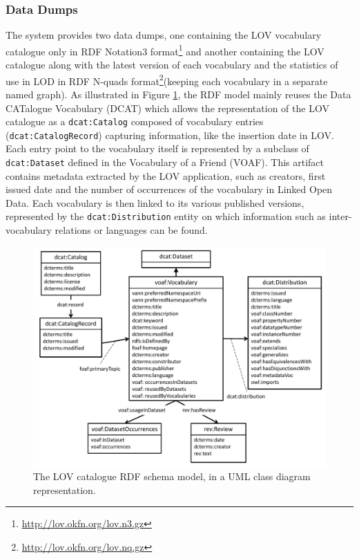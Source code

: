 \documentclass{iosart2c}
\begin{document}
\subsubsection{Data Dumps}
The system provides two data dumps, one containing the LOV vocabulary catalogue only in RDF Notation3 format\footnote{\url{http://lov.okfn.org/lov.n3.gz}} and another containing the LOV catalogue along with the latest version of each vocabulary and the statistics of use in LOD in RDF N-quads format\footnote{\url{http://lov.okfn.org/lov.nq.gz}}(keeping each vocabulary in a separate named graph). As illustrated in Figure \ref{fig:model}, the RDF model mainly reuses the Data CATalogue Vocabulary (DCAT) which allows the representation of the LOV catalogue as a {\small\texttt{dcat:Catalog}} composed of vocabulary entries ({\small\texttt{dcat:CatalogRecord}}) capturing information, like the insertion date in LOV. Each entry point to the vocabulary itself is represented by a subclass of {\small\texttt{dcat:Dataset}} defined in the Vocabulary of a Friend (VOAF). This artifact contains metadata extracted by the LOV application, such as creators, first issued date and the number of occurrences of the vocabulary in Linked Open Data. Each vocabulary is then linked to its various published versions, represented by the {\small\texttt{dcat:Distribution}} entity on which information such as inter-vocabulary relations or languages can be found.

\begin{figure}[!htb]
\includegraphics[width=.9\textwidth]{LOV_model.pdf}
\caption{The LOV catalogue RDF schema model, in a UML class diagram representation.}
\label{fig:model}
\end{figure}
\end{document}
